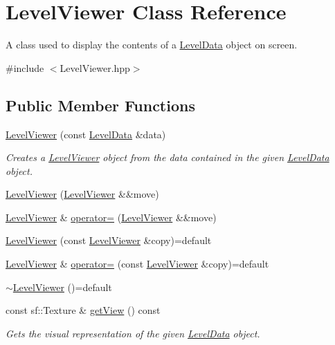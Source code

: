 \hypertarget{classLevelViewer}{\section{Level\+Viewer Class Reference}
\label{classLevelViewer}
}


A class used to display the contents of a \hyperlink{classLevelData}{Level\+Data} object on screen.  




{\ttfamily \#include $<$Level\+Viewer.\+hpp$>$}

\subsection*{Public Member Functions}
\begin{DoxyCompactItemize}
\item 
\hyperlink{classLevelViewer_a9455a951428ef99355e4b2431030cabc}{Level\+Viewer} (const \hyperlink{classLevelData}{Level\+Data} \&data)
\begin{DoxyCompactList}\small\item\em Creates a \hyperlink{classLevelViewer}{Level\+Viewer} object from the data contained in the given \hyperlink{classLevelData}{Level\+Data} object. \end{DoxyCompactList}\item 
\hyperlink{classLevelViewer_a6e93342a85445cbebe384e3320317c40}{Level\+Viewer} (\hyperlink{classLevelViewer}{Level\+Viewer} \&\&move)
\item 
\hyperlink{classLevelViewer}{Level\+Viewer} \& \hyperlink{classLevelViewer_aade4f376c18dc077ee4d0ff3112ef18b}{operator=} (\hyperlink{classLevelViewer}{Level\+Viewer} \&\&move)
\item 
\hyperlink{classLevelViewer_a2f53a7ddb76a94061cf4ea426c507791}{Level\+Viewer} (const \hyperlink{classLevelViewer}{Level\+Viewer} \&copy)=default
\item 
\hyperlink{classLevelViewer}{Level\+Viewer} \& \hyperlink{classLevelViewer_aa132fbf52763ffdd77bfcd38335056b8}{operator=} (const \hyperlink{classLevelViewer}{Level\+Viewer} \&copy)=default
\item 
\hyperlink{classLevelViewer_afeecb0c6e492d50e49bc13995b713055}{$\sim$\+Level\+Viewer} ()=default
\item 
const sf\+::\+Texture \& \hyperlink{classLevelViewer_ac7639fd457c73c851c8b86c11a7e7ea1}{get\+View} () const 
\begin{DoxyCompactList}\small\item\em Gets the visual representation of the given \hyperlink{classLevelData}{Level\+Data} object. \end{DoxyCompactList}\item 

\end{DoxyCompactItemize}
